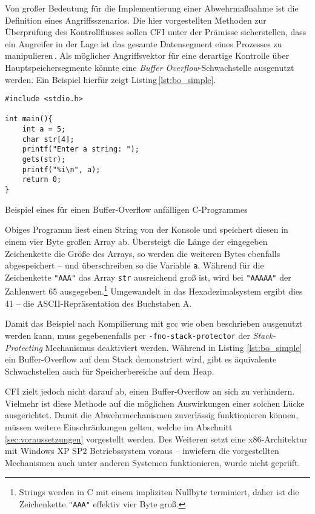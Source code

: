 Von großer Bedeutung für die Implementierung einer Abwehrmaßnahme ist die Definition eines Angriffsszenarios. Die hier vorgestellten Methoden zur Überprüfung des Kontrollflusses sollen CFI unter der Prämisse sicherstellen, dass ein Angreifer in der Lage ist das gesamte Datensegment eines Prozesses zu manipulieren\,\cite{Abadi.2009}. Als möglicher Angriffsvektor für eine derartige Kontrolle über Hauptspeichersegmente könnte eine \emph{Buffer Overflow}-Schwachstelle ausgenutzt werden. Ein Beispiel hierfür zeigt Listing\,\ref{lst:bo_simple}.

\begin{listing}
\begin{verbatim}
#include <stdio.h>

int main(){
	int a = 5;
	char str[4];
	printf("Enter a string: ");
	gets(str);
	printf("%i\n", a);
	return 0;
}
\end{verbatim}
\caption{Beispiel eines für einen Buffer-Overflow anfälligen C-Programmes}
\label{lst:bo_simple}
\end{listing}

Obiges Programm liest einen String von der Konsole und speichert diesen in einem vier Byte großen Array ab. Übersteigt die Länge der eingegeben Zeichenkette die Größe des Arrays, so werden die weiteren Bytes ebenfalls abgespeichert -- und überschreiben so die Variable \texttt{a}. Während für die Zeichenkette \texttt{"AAA"} das Array \texttt{str} ausreichend groß ist, wird bei \texttt{"AAAAA"} der Zahlenwert 65 ausgegeben.\footnote{Strings werden in C mit einem impliziten Nullbyte terminiert, daher ist die Zeichenkette \texttt{"AAA"} effektiv vier Byte groß.} Umgewandelt in das Hexadezimalsystem ergibt dies 41 -- die ASCII-Repräsentation des Buchstaben A.


Damit das Beispiel nach Kompilierung mit gcc wie oben beschrieben ausgenutzt werden kann, muss gegebenenfalls per \texttt{-fno-stack-protector} der \emph{Stack-Protecting} Mechanismus deaktiviert werden. Während in Listing \ref{lst:bo_simple} ein Buffer-Overflow auf dem Stack demonstriert wird, gibt es äquivalente Schwachstellen auch für Speicherbereiche auf dem Heap.


CFI zielt jedoch nicht darauf ab, einen Buffer-Overflow an sich zu verhindern. Vielmehr ist diese Methode auf die möglichen Auswirkungen einer solchen Lücke ausgerichtet. Damit die Abwehrmechanismen zuverlässig funktionieren können, müssen weitere Einschränkungen gelten, welche im Abschnitt \ref{sec:voraussetzungen} vorgestellt werden. Des Weiteren setzt \cite{Abadi.2009} eine x86-Architektur mit Windows XP SP2 Betriebssystem voraus -- inwiefern die vorgestellten Mechanismen auch unter anderen Systemen funktionieren, wurde nicht geprüft.

